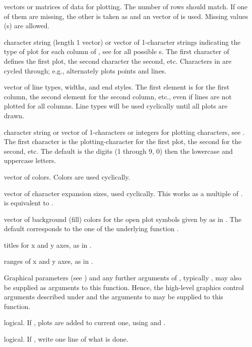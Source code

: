 \begin{Arguments}
\begin{ldescription}
\item[\code{x,y}] vectors or matrices of data for plotting.  The number of
rows should match.  If one of them are missing, the other is taken
as  and an  vector of  is used.
Missing values (s) are allowed.
\item[\code{type}] character string (length 1 vector) or vector of 1-character
strings indicating the type of plot for each
column of , see  for all possible
s.  The first character of 
defines the first plot, the second character the second, etc.
Characters in  are cycled through; e.g., 
alternately plots points and lines.
\item[\code{lty,lwd,lend}] vector of line types, widths, and end styles.
The first element is for the first column, the second element for
the second column, etc., even if lines are not plotted for all
columns. Line types will be used cyclically until all plots are
drawn.
\item[\code{pch}] character string or vector of 1-characters or integers for
plotting characters, see .
The first character is the plotting-character for the first plot,
the second for the second, etc.  The default is the digits (1
through 9, 0) then the lowercase and uppercase letters.






\item[\code{col}] vector of colors.  Colors are used cyclically.
\item[\code{cex}] vector of character expansion sizes, used cyclically.
This works as a multiple of .   is
equivalent to . 
\item[\code{bg}] vector of background (fill) colors for the open plot
symbols given by  as in .  The
default  corresponds to the one of the underlying function
.
\item[\code{xlab, ylab}] titles for x and y axes, as in .
\item[\code{xlim, ylim}] ranges of x and y axes, as in .
\item[\code{...}] Graphical parameters (see ) and any further
arguments of , typically , may also be
supplied as arguments to this function.  Hence, the high-level
graphics control arguments described under  and the
arguments to  may be supplied to this function.
\item[\code{add}] logical.  If , plots are added to current one,
using  and .
\item[\code{verbose}] logical.  If , write one line of what is
done.
\end{ldescription}
\end{Arguments}
